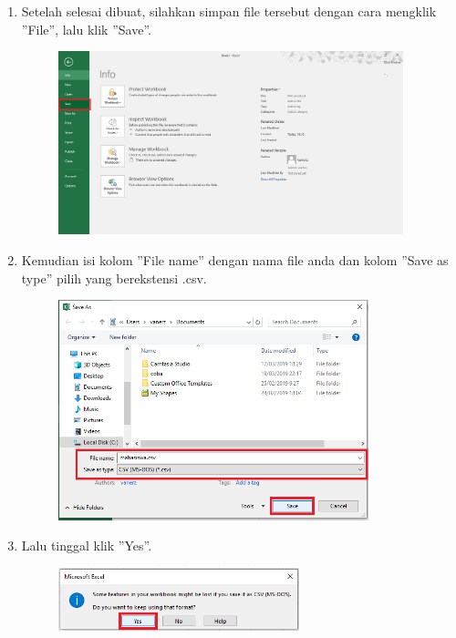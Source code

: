 \begin{enumerate}
\begin{enumerate}
		\item Setelah selesai dibuat, silahkan simpan file tersebut dengan cara mengklik ''File'', lalu klik ''Save''.
		
		\begin{figure}[H]
			\includegraphics[width=10cm]{figures/diva/Chapter4/t4.png}
			\centering
		\end{figure}
		
		\item Kemudian isi kolom ''File name'' dengan nama file anda dan kolom ''Save as type'' pilih yang berekstensi .csv.
		
		\begin{figure}[H]
			\includegraphics[width=9cm]{figures/diva/Chapter4/t5.png}
			\centering
		\end{figure}
		
		\item Lalu tinggal klik ''Yes''.
		
		\begin{figure}[H]
			\includegraphics[width=7cm]{figures/diva/Chapter4/t6.png}
			\centering
		\end{figure}
		

\end{enumerate}
\end{enumerate}
